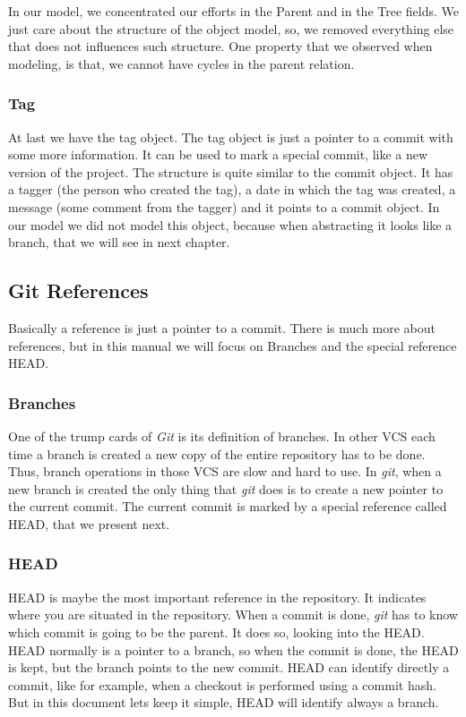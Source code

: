 In our model, we concentrated our efforts in the Parent and in the
Tree fields. We just care about the structure of the object model, so,
we removed everything else that does not influences such
structure. One property that we observed when modeling, is that, we
cannot have cycles in the parent relation.

\subsubsection{Tag}
At last we have the tag object. The tag object is just a pointer to
a commit with some more information. It can be used to mark a special 
commit, like a new version of the project. The structure is quite 
similar to the commit object. It has a tagger (the person who created 
the tag), a date in which the tag was created, a message (some
comment from the tagger) and it points to a commit object. In our
model we did not model this object, because when abstracting it looks
like a branch, that we will see in next chapter.

\subsection{Git References}
Basically a reference is just a pointer to a commit. There is much
more about references, but in this manual we will focus on
Branches and the special reference HEAD.

\subsubsection{Branches}
One of the trump cards of \emph{Git} is its definition of branches. In other
VCS each time a branch is created a new copy of the entire repository
has to be done. Thus, branch operations in those VCS are slow and hard to use. 
In \emph{git}, when a new branch is created the only thing that
\emph{git} does is to create a new pointer to the current
commit. The current commit is marked by a special reference called
HEAD, that we present next.

\subsubsection{HEAD}
HEAD is maybe the most important reference in the repository. It
indicates where you are situated in the repository. When a commit is
done, \emph{git} has to know which commit is going to be the parent. 
It does so, looking into the HEAD. HEAD normally is a
pointer to a branch, so when the commit is done, the HEAD is kept, but
the branch points to the new commit. HEAD can identify directly a
commit, like for example, when a checkout is performed using a commit hash. But in this document lets keep it simple, HEAD will identify always a branch.


